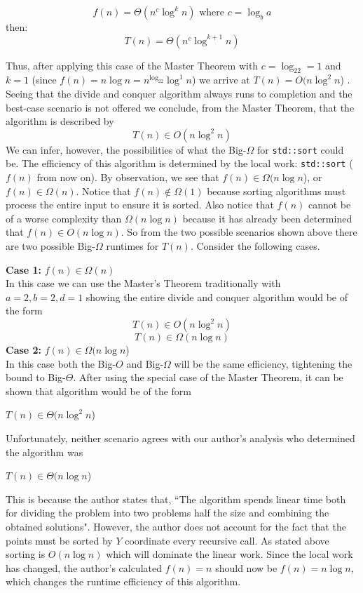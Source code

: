 \documentclass[11pt]{article}
\begin{document}
\[	f(n) = \Theta(n^c\log^kn) \text{ where } c=\log_ba
\]
	then:
\[	
T(n) = \Theta(n^c\log^{k+1}n)
\]

 Thus, after applying this case of the Master Theorem with $c=\log_22=1$ and $k=1$ (since $f(n)=n\log n=n^{\log_22}\log^1n$) we arrive at $T(n)=O(n\log^2n$) \cite{algo}.
Seeing that the divide and conquer algorithm always runs to completion and the best-case scenario is not offered we conclude, from the  Master Theorem, that the algorithm is described by
\[
T(n) \in O( n \log^2n)
\]
We can infer, however, the possibilities of what the Big-$\Omega$ for \texttt{std::sort} could be. The efficiency of this algorithm is determined by the local work: \texttt{std::sort} ($f(n)$ from now on). By observation, we see that $f(n)\in \Omega(n\log n$), or $f(n) \in \Omega(n)$. Notice that $f(n) \notin \Omega(1)$  because sorting algorithms must process the entire input to ensure it is sorted. Also notice that $f(n)$ cannot be of a worse complexity than $\Omega(n\log n)$ because it has already been determined that $f(n)\in O(n\log n)$. So from the two possible scenarios shown above there are two possible Big-$\Omega$ runtimes for $T(n)$. Consider the following cases.

\textbf{Case 1:} $f(n) \in \Omega(n)$\\
 In this case we can use the Master's Theorem traditionally with $a=2,b=2,d=1$ showing the entire divide and conquer algorithm would be of the form
\[
T(n) \in O( n \log^2n)
\]
\[
T(n) \in \Omega(n \log n)
\]
\textbf{Case 2:} $f(n) \in \Omega(n\log n$)\\
 In this case both the Big-$O$ and Big-$\Omega$ will be the same efficiency, tightening the bound to Big-$\Theta$. After using the special case of the Master Theorem, it can be shown that algorithm would be of the form
\begin{center}
$T(n) \in \Theta(n\log^2n$)
\end{center}
\vspace{10 mm}

Unfortunately, neither scenario agrees with our author's analysis who determined the algorithm was
\begin{center}
$T(n) \in \Theta( n\log n$)
\end{center}
This is because the author states that, ``The algorithm spends linear time both for dividing the problem into two problems half the size and combining the obtained solutions"\cite{levit}. However, the author does not account for the fact that the points must be sorted by $Y$ coordinate every recursive call. As stated above sorting is $O(n\log n)$ which will dominate the linear work. Since the local work has changed, the author's calculated $f(n)=n$ should now be $f(n)=n\log n$, which changes the runtime efficiency of this algorithm.
\nocite{*}
\clearpage
\printbibliography
\end{document}
